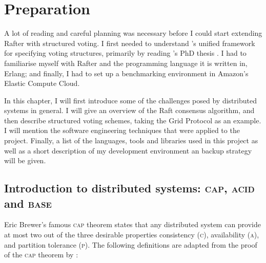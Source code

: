 \documentclass[11pt,chapterprefix=true,toc=bibliography,numbers=noendperiod,
               footnotes=multiple,twoside]{scrreprt}
\begin{document}
\chapter{Preparation\label{ch:preparation}}

A lot of reading and careful planning was necessary before I could start extending Rafter with structured voting. I first needed to understand \citeauthor{generators}'s unified framework for specifying voting structures, primarily by reading \citeauthor{voting}'s PhD thesis \autocite{voting}. I had to familiarise myself with Rafter and the programming language it is written in, Erlang; and finally, I had to set up a benchmarking environment in Amazon's Elastic Compute Cloud.

In this chapter, I will first introduce some of the challenges posed by distributed systems in general. I will give an overview of the Raft consensus algorithm, and then describe structured voting schemes, taking the Grid Protocol as an example. I will mention the software engineering techniques that were applied to the project. Finally, a list of the languages, tools and libraries used in this project as well as a short description of my development environment an backup strategy will be given.


\section[Introduction to distributed systems]{Introduction to distributed systems: \textsc{cap}, \textsc{acid} and \textsc{base}\label{ssc:cap-acid-and-base}}

Eric Brewer's famous \textsc{cap} theorem states that any distributed system can provide at most two out of the three desirable properties consistency (\textsc{c}), availability (\textsc{a}), and partition tolerance (\textsc{p}).\autocite{cap} The following definitions are adapted from the proof of the \textsc{cap} theorem by \citeauthor{capproof}:\autocite{capproof}
\end{document}
